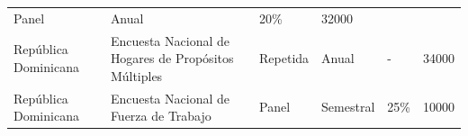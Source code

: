 \documentclass[12pt,spanish,]{book}
\begin{document}
\begin{longtable}[]{@{}llllll@{}}
\begin{minipage}[t]{0.06\columnwidth}
Panel\strut
\end{minipage} & \begin{minipage}[t]{0.08\columnwidth}\raggedright
Anual\strut
\end{minipage} & \begin{minipage}[t]{0.06\columnwidth}\raggedright
20\%\strut
\end{minipage} & \begin{minipage}[t]{0.13\columnwidth}\raggedright
32000\strut
\end{minipage}\tabularnewline
\begin{minipage}[t]{0.13\columnwidth}\raggedright
República Dominicana\strut
\end{minipage} & \begin{minipage}[t]{0.38\columnwidth}\raggedright
Encuesta Nacional de Hogares de Propósitos Múltiples\strut
\end{minipage} & \begin{minipage}[t]{0.06\columnwidth}\raggedright
Repetida\strut
\end{minipage} & \begin{minipage}[t]{0.08\columnwidth}\raggedright
Anual\strut
\end{minipage} & \begin{minipage}[t]{0.06\columnwidth}\raggedright
-\strut
\end{minipage} & \begin{minipage}[t]{0.13\columnwidth}\raggedright
34000\strut
\end{minipage}\tabularnewline
\begin{minipage}[t]{0.13\columnwidth}\raggedright
República Dominicana\strut
\end{minipage} & \begin{minipage}[t]{0.38\columnwidth}\raggedright
Encuesta Nacional de Fuerza de Trabajo\strut
\end{minipage} & \begin{minipage}[t]{0.06\columnwidth}\raggedright
Panel\strut
\end{minipage} & \begin{minipage}[t]{0.08\columnwidth}\raggedright
Semestral\strut
\end{minipage} & \begin{minipage}[t]{0.06\columnwidth}\raggedright
25\%\strut
\end{minipage} & \begin{minipage}[t]{0.13\columnwidth}\raggedright
10000\strut
\end{minipage}\tabularnewline

\end{longtable}
\end{document}
